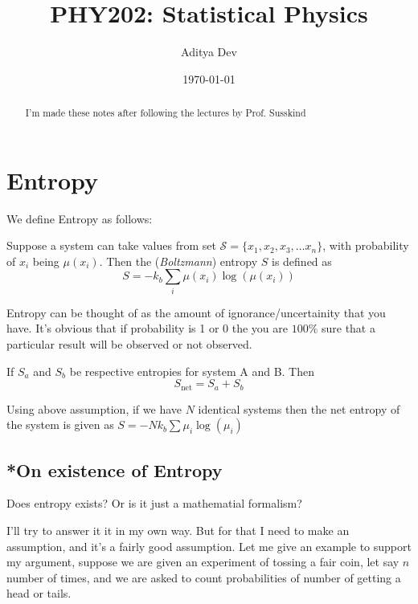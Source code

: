 \documentclass{tufte-handout}
\title{\centering PHY202: Statistical Physics}
\author{Aditya Dev}
\date{\today} %
\begin{document}
\maketitle%

\begin{abstract}
\noindent
I'm made these notes after following the lectures by Prof. Susskind 
\end{abstract}



\section{Entropy}\label{sec:page-layout}

We define Entropy as follows:

\begin{definition}[Entropy]\label{def:entropy}
	Suppose a system can take values from set \(\mathcal{S} = \{x_1, x_2, x_3, \ldots x_n\}\), 
	with probability of 
	\(x_i\) being \(\mu(x_i)\). Then the (\textit{Boltzmann}) entropy \(S\) is defined as 
	\[S = -k_b \sum _{i} \mu(x_i) \log(\mu(x_i))\]
\end{definition}

Entropy can be thought of as the amount of ignorance/uncertainity that you have. It's obvious that if 
probability is 1 or 0 the you are \(100 \%\) sure that a particular result will be observed or not 
observed. 

\begin{assume} 
	If \(S_a\) and \(S_b\) be respective entropies for system A and B. Then 
	\[S_{\mathrm{net}} = S_a + S_b\]
	\label{assum:entropy}
\end{assume}

Using above assumption, if we have \(N\) identical systems then the net entropy of the system is
given as \(S = -Nk_b \sum \mu_i\log(\mu_i)\)

\subsection{*On existence of Entropy}

Does entropy exists? Or is it just a mathematial formalism? 

I'll try to answer it it in my own way. But for that I need to make an assumption, and
it's a fairly good assumption. Let me give an example to support my argument, 
suppose we are given an experiment  of tossing a fair coin, let say \(n\) number 
of times, and we are asked to count probabilities of number of getting a head or tails. 
\end{document}
